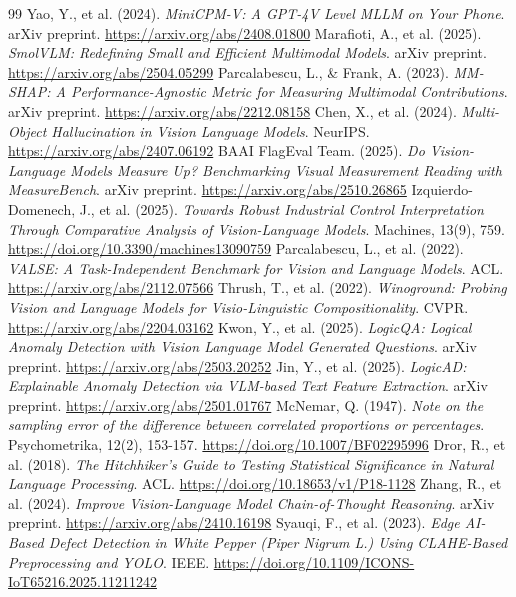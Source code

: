\documentclass{article}
\begin{document}
\begin{thebibliography}{99}
 Yao, Y., et al. (2024). \textit{MiniCPM-V: A GPT-4V Level MLLM on Your Phone}. arXiv preprint. \url{https://arxiv.org/abs/2408.01800}
 Marafioti, A., et al. (2025). \textit{SmolVLM: Redefining Small and Efficient Multimodal Models}. arXiv preprint. \url{https://arxiv.org/abs/2504.05299}
 Parcalabescu, L., \& Frank, A. (2023). \textit{MM-SHAP: A Performance-Agnostic Metric for Measuring Multimodal Contributions}. arXiv preprint. \url{https://arxiv.org/abs/2212.08158}
 Chen, X., et al. (2024). \textit{Multi-Object Hallucination in Vision Language Models}. NeurIPS. \url{https://arxiv.org/abs/2407.06192}
 BAAI FlagEval Team. (2025). \textit{Do Vision-Language Models Measure Up? Benchmarking Visual Measurement Reading with MeasureBench}. arXiv preprint. \url{https://arxiv.org/abs/2510.26865}
 Izquierdo-Domenech, J., et al. (2025). \textit{Towards Robust Industrial Control Interpretation Through Comparative Analysis of Vision-Language Models}. Machines, 13(9), 759. \url{https://doi.org/10.3390/machines13090759}
 Parcalabescu, L., et al. (2022). \textit{VALSE: A Task-Independent Benchmark for Vision and Language Models}. ACL. \url{https://arxiv.org/abs/2112.07566}
 Thrush, T., et al. (2022). \textit{Winoground: Probing Vision and Language Models for Visio-Linguistic Compositionality}. CVPR. \url{https://arxiv.org/abs/2204.03162}
 Kwon, Y., et al. (2025). \textit{LogicQA: Logical Anomaly Detection with Vision Language Model Generated Questions}. arXiv preprint. \url{https://arxiv.org/abs/2503.20252}
 Jin, Y., et al. (2025). \textit{LogicAD: Explainable Anomaly Detection via VLM-based Text Feature Extraction}. arXiv preprint. \url{https://arxiv.org/abs/2501.01767}
 McNemar, Q. (1947). \textit{Note on the sampling error of the difference between correlated proportions or percentages}. Psychometrika, 12(2), 153-157. \url{https://doi.org/10.1007/BF02295996}
 Dror, R., et al. (2018). \textit{The Hitchhiker's Guide to Testing Statistical Significance in Natural Language Processing}. ACL. \url{https://doi.org/10.18653/v1/P18-1128}
 Zhang, R., et al. (2024). \textit{Improve Vision-Language Model Chain-of-Thought Reasoning}. arXiv preprint. \url{https://arxiv.org/abs/2410.16198}
 Syauqi, F., et al. (2023). \textit{Edge AI-Based Defect Detection in White Pepper (Piper Nigrum L.) Using CLAHE-Based Preprocessing and YOLO}. IEEE. \url{https://doi.org/10.1109/ICONS-IoT65216.2025.11211242}

\end{thebibliography}
\end{document}
